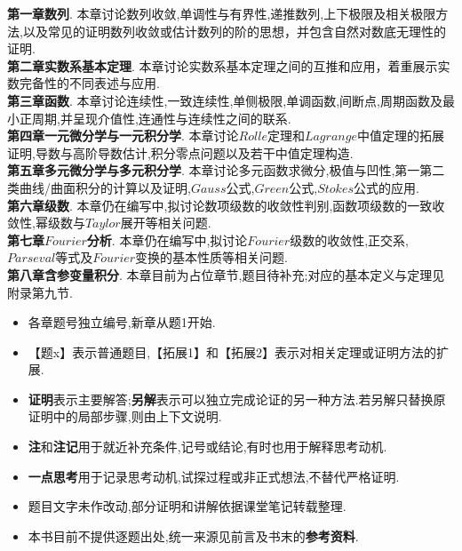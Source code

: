 \documentclass[a4paper,12pt,fleqn,openany,twoside,fontset=windows]{ctexbook}
\begin{document}
\pagestyle{plainnowm}
\begin{booknotelongbody}
\textbf{第一章\quad 数列}. 本章讨论数列收敛,单调性与有界性,递推数列,上下极限及相关极限方法,以及常见的证明数列收敛或估计数列的阶的思想，并包含自然对数底无理性的证明. \\

\textbf{第二章\quad 实数系基本定理}. 本章讨论实数系基本定理之间的互推和应用，着重展示实数完备性的不同表述与应用.\\

\textbf{第三章\quad 函数}. 本章讨论连续性,一致连续性,单侧极限,单调函数,间断点,周期函数及最小正周期,并呈现介值性,连通性与连续性之间的联系.\\

\textbf{第四章\quad 一元微分学与一元积分学}. 本章讨论$Rolle$定理和$Lagrange$中值定理的拓展证明,导数与高阶导数估计,积分零点问题以及若干中值定理构造.\\

\textbf{第五章\quad 多元微分学与多元积分学}. 本章讨论多元函数求微分,极值与凹性,第一第二类曲线/曲面积分的计算以及证明,$Gauss$公式,$Green$公式,$Stokes$公式的应用.\\

\textbf{第六章\quad 级数}. 本章仍在编写中,拟讨论数项级数的收敛性判别,函数项级数的一致收敛性,幂级数与$Taylor$展开等相关问题.\\

\textbf{第七章\quad $Fourier$分析}. 本章仍在编写中,拟讨论$Fourier$级数的收敛性,正交系,$Parseval$等式及$Fourier$变换的基本性质等相关问题.\\

\textbf{第八章\quad 含参变量积分}. 本章目前为占位章节,题目待补充;对应的基本定义与定理见附录第九节.\\

\end{booknotelongbody}
\pagestyle{main}
\clearpage

\pagestyle{plainnowm}
\begin{booknotelongbody}
\begin{itemize}[leftmargin=2\ccwd,itemsep=0.55em,topsep=0pt]
    \item 各章题号独立编号,新章从题1开始.
    \item 【题x】表示普通题目,【拓展1】和【拓展2】表示对相关定理或证明方法的扩展.
    \item \textbf{证明}表示主要解答;\textbf{另解}表示可以独立完成论证的另一种方法.若另解只替换原证明中的局部步骤,则由上下文说明.
    \item \textbf{注}和\textbf{注记}用于就近补充条件,记号或结论,有时也用于解释思考动机.
    \item \textbf{一点思考}用于记录思考动机,试探过程或非正式想法,不替代严格证明.
    \item 题目文字未作改动,部分证明和讲解依据课堂笔记转载整理.
    \item 本书目前不提供逐题出处,统一来源见前言及书末的\textbf{参考资料}.
\end{itemize}
\end{booknotelongbody}
\pagestyle{main}
\clearpage
\end{document}
